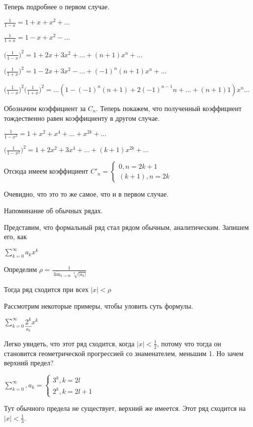 \begin{enumerate}
\begin{example}
Теперь подробнее о первом случае.

$\frac 1 {1-x} = 1 + x + x^2 + \dots $

$ \frac 1 {1+x} = 1 - x + x^2 - \dots $

$ \bigg ( \frac 1 {1-x} \bigg ) ^2 = 1 + 2x + 3x^2 + \dots + (n+1)x^n + \dots $

$ \bigg ( \frac 1 {1+x} \bigg ) ^2 = 1 - 2x + 3x^2 - \dots + (-1)^n (n+1)x^n + \dots $

$ \bigg ( \frac 1 {1-x} \bigg ) ^2 \bigg ( \frac 1 {1+x} \bigg )^2 = \dots (1 - (-1)^n (n+1) + 2(-1)^{n-1} n + \dots + (n+1) 1) x^n \dots $

Обозначим коэффициент за $C_n$. Теперь покажем, что полученный коэффициент тождественно равен коэффициенту в другом случае.

$\frac 1 {1-x^2} = 1 + x^2 + x^4 + \dots + x^{2k} + \dots $

$\bigg( \frac 1 {1-x^2}\bigg)^2 = 1 + 2x^2 + 3 x^4 + \dots + (k+1) x^{2k} + \dots $

Отсюда имеем коэффициент $C'_n = 
	\begin{cases}
	 0, n = 2k+1 \\
	 (k+1), n = 2k
	 \end{cases} 
	 $

Очевидно, что это то же самое, что и в первом случае.
\end{example}

\end{enumerate}

 
\begin{rem} Напоминание об обычных рядах.

Представим, что формальный ряд стал рядом обычным, аналитическим. Запишем его, как

$\sum \limits _{k=0} ^\infty a_k x^k $

Определим $\rho = \frac 1 {\displaystyle \overline{\lim}_{k \to \infty}  \sqrt[k] {|a_k|} } $


Тогда ряд сходится при всех $ |x| < \rho $

 
Рассмотрим некоторые примеры, чтобы уловить суть формулы.

$\sum \limits _{k=0} ^\infty \underbrace{ 2^k } _{a_k} x^k $

Легко увидеть, что этот ряд сходится, когда $|x |< \frac 1 2$, потому что тогда он становится геометрической прогрессией со знаменателем, меньшим 1. Но зачем  верхний предел?

$\sum \limits _{k=0} ^\infty, a_k = 
\begin{cases}
 3^k, k = 2l \\
 2^k, k = 2l + 1
 \end{cases}
$

Тут обычного предела не существует, верхний же имеется. Этот ряд сходится на $ |x| < \frac 1 3$.

\end{rem} 
